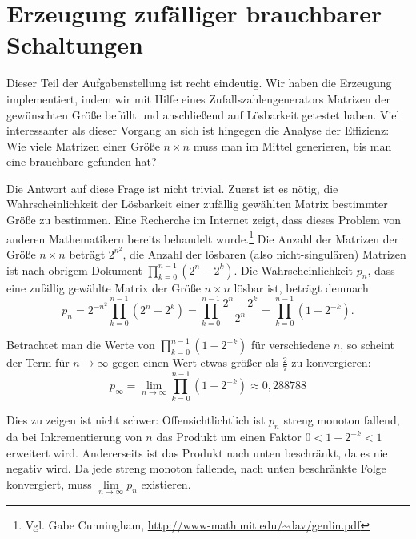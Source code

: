 \documentclass{scrartcl}
\begin{document}
\section{Erzeugung zufälliger brauchbarer Schaltungen}
Dieser Teil der Aufgabenstellung ist recht eindeutig. Wir haben die Erzeugung
implementiert, indem wir mit Hilfe eines Zufallszahlengenerators Matrizen der
gewünschten Größe befüllt und anschließend auf Lösbarkeit getestet haben. Viel
interessanter als dieser Vorgang an sich ist hingegen die Analyse der Effizienz:
Wie viele Matrizen einer Größe $n\times n$ muss man im Mittel generieren,
bis man eine brauchbare gefunden hat?

Die Antwort auf diese Frage ist nicht trivial. Zuerst ist es nötig, die
Wahrscheinlichkeit der Lösbarkeit einer zufällig gewählten Matrix bestimmter
Größe zu bestimmen. Eine Recherche im Internet zeigt, dass dieses Problem von
anderen Mathematikern bereits behandelt wurde.\footnote{Vgl. Gabe Cunningham,
\url{http://www-math.mit.edu/~dav/genlin.pdf}} Die Anzahl der Matrizen der Größe
$n\times n$ beträgt $2^{n^2}$, die Anzahl der lösbaren (also nicht-singulären)
Matrizen ist nach obrigem Dokument $\prod_{k=0}^{n-1}(2^n-2^k)$. Die
Wahrscheinlichkeit $p_n$, dass eine zufällig gewählte Matrix der Größe
$n\times n$ lösbar ist, beträgt demnach
\begin{equation}
p_n=
2^{-n^2}\prod\limits_{k=0}^{n-1}(2^n-2^k)=
\prod_{k=0}^{n-1}\frac{2^n-2^k}{2^n}=
\prod_{k=0}^{n-1}(1-2^{-k}).
\end{equation}

Betrachtet man die Werte von $\prod_{k=0}^{n-1}(1-2^{-k})$ für verschiedene
$n$, so scheint der Term für $n\to\infty$ gegen einen Wert etwas größer als
$\frac27$ zu konvergieren:
\begin{equation}
p_\infty=\lim_{n\to\infty}\prod_{k=0}^{n-1}(1-2^{-k})\approx 0{,}288788
\end{equation}

Dies zu zeigen ist nicht schwer: Offensichtlichtlich ist $p_n$ streng monoton
fallend, da bei Inkrementierung von $n$ das Produkt um einen Faktor
$0<1-2^{-k}<1$ erweitert wird. Andererseits ist das Produkt nach unten
beschränkt, da es nie negativ wird. Da jede streng monoton fallende, nach unten
beschränkte Folge konvergiert, muss $\lim\limits_{n\to\infty}p_n$ existieren.
\end{document}
